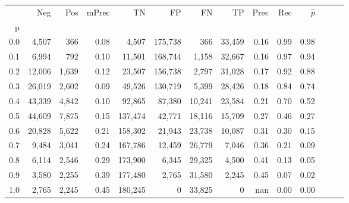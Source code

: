 \begin{tabular}{rrrrrrrrrrrrrr}
\toprule
{} &     Neg &    Pos & mPrec &       TN &       FP &      FN &      TP &  Prec &   Rec & $\hat{p}$ \\
p   &         &        &       &          &          &         &         &       &       &           \\
\midrule
0.0 &   4,507 &    366 &  0.08 &    4,507 &  175,738 &     366 &  33,459 &  0.16 &  0.99 &      0.98 \\
0.1 &   6,994 &    792 &  0.10 &   11,501 &  168,744 &   1,158 &  32,667 &  0.16 &  0.97 &      0.94 \\
0.2 &  12,006 &  1,639 &  0.12 &   23,507 &  156,738 &   2,797 &  31,028 &  0.17 &  0.92 &      0.88 \\
0.3 &  26,019 &  2,602 &  0.09 &   49,526 &  130,719 &   5,399 &  28,426 &  0.18 &  0.84 &      0.74 \\
0.4 &  43,339 &  4,842 &  0.10 &   92,865 &   87,380 &  10,241 &  23,584 &  0.21 &  0.70 &      0.52 \\
0.5 &  44,609 &  7,875 &  0.15 &  137,474 &   42,771 &  18,116 &  15,709 &  0.27 &  0.46 &      0.27 \\
0.6 &  20,828 &  5,622 &  0.21 &  158,302 &   21,943 &  23,738 &  10,087 &  0.31 &  0.30 &      0.15 \\
0.7 &   9,484 &  3,041 &  0.24 &  167,786 &   12,459 &  26,779 &   7,046 &  0.36 &  0.21 &      0.09 \\
0.8 &   6,114 &  2,546 &  0.29 &  173,900 &    6,345 &  29,325 &   4,500 &  0.41 &  0.13 &      0.05 \\
0.9 &   3,580 &  2,255 &  0.39 &  177,480 &    2,765 &  31,580 &   2,245 &  0.45 &  0.07 &      0.02 \\
1.0 &   2,765 &  2,245 &  0.45 &  180,245 &        0 &  33,825 &       0 &   nan &  0.00 &      0.00 \\
\bottomrule
\end{tabular}
